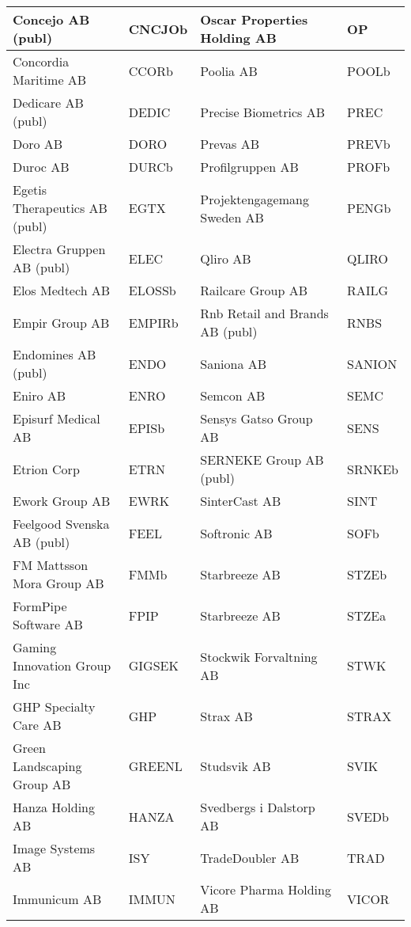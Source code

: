 \documentclass[11pt]{article}
\numberwithin{equation}{section}
\numberwithin{table}{section}
\numberwithin{figure}{section}
\begin{document}
\begin{table}[H]
{\begin{tabular}{|l|l|l|l|}
Concejo AB (publ) & CNCJOb & Oscar Properties Holding AB & OP \\ \hline
\rowcolor[HTML]{EFEFEF} 
Concordia Maritime AB & CCORb & Poolia AB & POOLb \\ \hline
Dedicare AB (publ) & DEDIC & Precise Biometrics AB & PREC \\ \hline
\rowcolor[HTML]{EFEFEF} 
Doro AB & DORO & Prevas AB & PREVb \\ \hline
Duroc AB & DURCb & Profilgruppen AB & PROFb \\ \hline
\rowcolor[HTML]{EFEFEF} 
Egetis Therapeutics AB (publ) & EGTX & Projektengagemang Sweden AB & PENGb \\ \hline
Electra Gruppen AB (publ) & ELEC & Qliro AB & QLIRO \\ \hline
\rowcolor[HTML]{EFEFEF} 
Elos Medtech AB & ELOSSb & Railcare Group AB & RAILG \\ \hline
Empir Group AB & EMPIRb & Rnb Retail and Brands AB (publ) & RNBS \\ \hline
\rowcolor[HTML]{EFEFEF} 
Endomines AB (publ) & ENDO & Saniona AB & SANION \\ \hline
Eniro AB & ENRO & Semcon AB & SEMC \\ \hline
\rowcolor[HTML]{EFEFEF} 
Episurf Medical AB & EPISb & Sensys Gatso Group AB & SENS \\ \hline
Etrion Corp & ETRN & SERNEKE Group AB (publ) & SRNKEb \\ \hline
\rowcolor[HTML]{EFEFEF} 
Ework Group AB & EWRK & SinterCast AB & SINT \\ \hline
Feelgood Svenska AB (publ) & FEEL & Softronic AB & SOFb \\ \hline
\rowcolor[HTML]{EFEFEF} 
FM Mattsson Mora Group AB & FMMb & Starbreeze AB & STZEb \\ \hline
FormPipe Software AB & FPIP & Starbreeze AB & STZEa \\ \hline
\rowcolor[HTML]{EFEFEF} 
Gaming Innovation Group Inc & GIGSEK & Stockwik Forvaltning AB & STWK \\ \hline
GHP Specialty Care AB & GHP & Strax AB & STRAX \\ \hline
\rowcolor[HTML]{EFEFEF} 
Green Landscaping Group AB & GREENL & Studsvik AB & SVIK \\ \hline
Hanza Holding AB & HANZA & Svedbergs i Dalstorp AB & SVEDb \\ \hline
\rowcolor[HTML]{EFEFEF} 
Image Systems AB & ISY & TradeDoubler AB & TRAD \\ \hline
Immunicum AB & IMMUN & Vicore Pharma Holding AB & VICOR \\ \hline

\end{tabular}}
\end{table}
\end{document}

